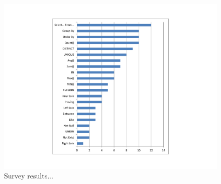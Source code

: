 
\begin{figure}[t]
  \centering
  \includegraphics[scale=0.50]{survey}
  \vspace*{-1.0ex}\caption {{\label{fig:survey} Survey results...
}}

\end{figure}

\newcommand{\q}{\langle query\rangle}
\newcommand{\db}{\langle db\rangle}
\newcommand{\pat}{\langle pat\rangle}
\newcommand{\bug}{\langle bug\rangle}
\newcommand{\dist}{\langle distance\rangle}
\newcommand{\sem}[1]{\llbracket #1\rrbracket}
\newcommand{\lit}[1]{\texttt{#1}}

\newcommand{\column}{\langle column\rangle}
\newcommand{\dbtable}{\langle table\rangle}
\newcommand{\cond}{\langle cond\rangle}
\newcommand{\op}{\langle op\rangle}
\newcommand{\e}{\langle expr\rangle}
\newcommand{\ce}{\langle cexpr\rangle}

